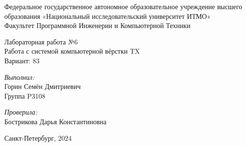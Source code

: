 


\begin{center}
\large Федеральное государственное автономное образовательное учреждение высшего образования «Национальный исследовательский университет ИТМО»\\
Факультет Программной Инженерии и Компьютерной Техники\\
\hfill 


\vspace{7cm}
\Large Лабораторная работа №6 \\
Работа с системой компьютерной вёрстки T\raisebox{-0.3em}{E}X\\
Вариант: 83\\
\end{center}

\vspace{7.5cm}
 
\begin{flushright}
\textit{Выполнил:}\\
Горин Семён Дмитриевич\\
Группа P3108\

\textit{Проверила:}\\
Бострикова Дарья Константиновна\\
\end{flushright}
 
\vfill

\begin{center} Санкт-Петербург, 2024 \end{center}

\thispagestyle{empty}
\newpage
